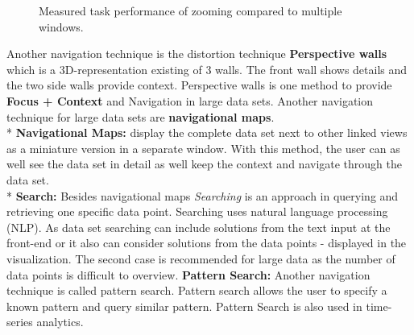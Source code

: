 \begin{figure}[H]
    \centering
    \caption{Measured task performance of zooming compared to multiple windows. \cite{Ware2012a}}
    \label{fig:my_label}
\end{figure}
Another navigation technique is the distortion technique \textbf{Perspective walls} which is a 3D-representation existing of 3 walls. The front wall shows details and the two side walls provide context. Perspective walls is one method to provide \textbf{Focus + Context} and Navigation in large data sets.
Another navigation technique for large data sets are \textbf{navigational maps}.\\*
\textbf{Navigational Maps: } display the complete data set next to other linked views as a miniature version in a separate window. With this method, the user can as well see the data set in detail as well keep the context and navigate through the data set.\\*
\textbf{Search: } Besides navigational maps \textit{Searching} is an approach in querying and retrieving one specific data point. Searching uses natural language processing (NLP). As data set searching can include solutions from the text input at the front-end or it also can consider solutions from the data points - displayed in the visualization. The second case is recommended for large data as the number of data points is difficult to overview.
\textbf{Pattern Search: }Another navigation technique is called pattern search. Pattern search allows the user to specify a known pattern and query similar pattern\cite{Buono}. Pattern Search is also used in time-series analytics.
\par

